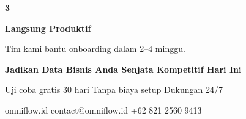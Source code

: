 \documentclass[a4paper]{article}
\begin{document}
\begin{center}
\begin{minipage}[t]{0.318\textwidth}
{\begin{minipage}{\dimexpr\linewidth-2\fboxsep\relax}
            \begin{center}
                {\fontsize{22}{26}\selectfont\bfseries\color{BluePrimary} 3}
            \end{center}
            \vspace{2pt}
            \begin{center}
                {\fontsize{10}{13}\selectfont\bfseries\color{BlueDark} Langsung Produktif}\par\vspace{3pt}
                {\fontsize{9}{12}\selectfont\color{TextDark} Tim kami bantu onboarding dalam 2--4 minggu.}
            \end{center}
            \vspace{6pt}
        \end{minipage}}
\end{minipage}
\end{center}

\vspace{8pt}

{\setlength{\fboxsep}{10pt}\setlength{\fboxrule}{0pt}%
\noindent\colorbox{BluePrimary}{%
    \begin{minipage}{\dimexpr\textwidth-2\fboxsep\relax}
        \centering
        {\fontsize{13}{16}\selectfont\bfseries\color{White}
        Jadikan Data Bisnis Anda Senjata Kompetitif Hari Ini}\par\vspace{3pt}
        {\fontsize{9.5}{12}\selectfont\color{BlueMid}
        Uji coba gratis 30 hari \enspace\textbullet\enspace Tanpa biaya setup \enspace\textbullet\enspace Dukungan 24/7}\par\vspace{2pt}
        {\fontsize{9.5}{12}\selectfont\color{BlueLight}
        omniflow.id \enspace\textbullet\enspace contact@omniflow.id \enspace\textbullet\enspace +62 821 2560 9413}
    \end{minipage}}}

\restoregeometry
\pagestyle{empty}
\end{document}
